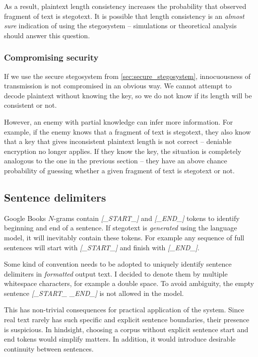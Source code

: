 \documentclass[draft]{IIBproject}
\DeclareRobustCommand{\ngram}[1]{\emph{[#1]}}
\begin{document}
As a result, plaintext length consistency increases the probability that observed fragment of text is stegotext. It is possible that length consistency is an \emph{almost sure} indication of using the stegosystem -- simulations or theoretical analysis should answer this question.

\subsubsection{Compromising security}

If we use the secure stegosystem from \cref{sec:secure_stegosystem}, innocuousness of transmission is not compromised in an obvious way. We cannot attempt to decode plaintext without knowing the key, so we do not know if its length will be consistent or not.

However, an enemy with partial knowledge can infer more information. For example, if the enemy knows that a fragment of text is stegotext, they also know that a key that gives inconsistent plaintext length is not correct -- deniable encryption no longer applies. If they know the key, the situation is completely analogous to the one in the previous section -- they have an above chance probability of guessing whether a given fragment of text is stegotext or not.

\subsection{Sentence delimiters}

Google Books $N$-grams contain \ngram{\_START\_} and \ngram{\_END\_} tokens to identify beginning and end of a sentence. If stegotext is \emph{generated} using the language model, it will inevitably contain these tokens. For example any sequence of full sentences will start with \ngram{\_START\_} and finish with \ngram{\_END\_}.

Some kind of convention needs to be adopted to uniquely identify sentence delimiters in \emph{formatted} output text. I decided to denote them by multiple whitespace characters, for example a double space. To avoid ambiguity, the empty sentence \ngram{\_START\_ \_END\_} is not allowed in the model.

This has non-trivial consequences for practical application of the system. Since real text rarely has such specific and explicit sentence boundaries, their presence is suspicious. In hindsight, choosing a corpus without explicit sentence start and end tokens would simplify matters. In addition, it would introduce desirable continuity between sentences.
\end{document}

